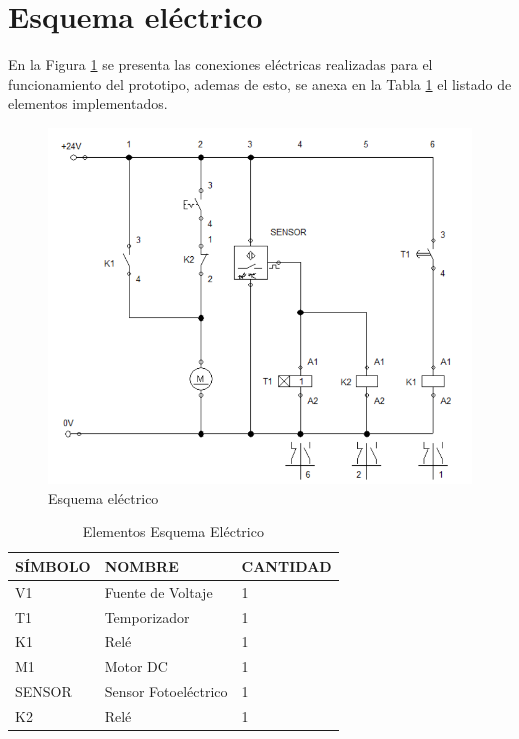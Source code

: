 \newpage
	\section{Esquema eléctrico}
		En la Figura \ref{fig:Esquema} se presenta las conexiones eléctricas realizadas para el funcionamiento del prototipo, ademas de esto, se anexa en la Tabla \ref{table:esquema} el listado de elementos implementados.  
		\begin{figure}[ht]
			\centering
			\includegraphics[scale=0.5]{Figs/66.png}
			\caption{Esquema eléctrico}
			\label{fig:Esquema}
		\end{figure}
	
		\begin{table}[ht]
		\centering
		\begin{tabular}{|p{2cm}|p{5cm}||p{3cm}|}
			\hline
			SÍMBOLO & NOMBRE & CANTIDAD \\ 
			\hline
			 V1 & Fuente de Voltaje & 1 \\
			\hline
			 T1 & Temporizador & 1 \\
			\hline
			 K1 & Relé & 1 \\
			\hline
			 M1 & Motor DC & 1 \\
			\hline
			 SENSOR & Sensor Fotoeléctrico & 1 \\
			\hline
			 K2 & Relé & 1 \\
			\hline
		\end{tabular}	
		\caption{Elementos Esquema Eléctrico}
		\label{table:esquema}
		\end{table}	
		

